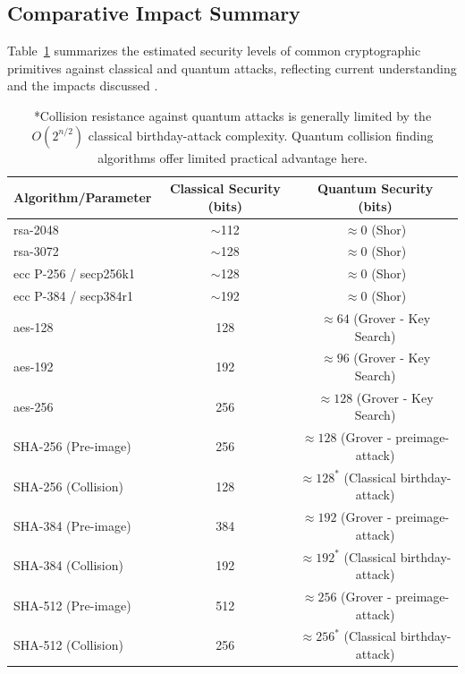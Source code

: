 \subsection{Comparative Impact Summary}\label{subsec:comparison_ch5_rev}
Table~\ref{tab:quantum_impact_ch5_rev_updated} summarizes the estimated security levels of common cryptographic primitives against classical and quantum attacks, reflecting current understanding and the impacts discussed \parencite{nist_pqc_status_report_ir8413}.

\begin{table}[h]
    \centering
    \caption{Estimated Security Levels (in bits) Against Classical and Quantum Attacks}
    \label{tab:quantum_impact_ch5_rev_updated}
    \begin{tabular}{@{}lcc@{}}
        \toprule
        \textbf{Algorithm/Parameter} & \textbf{Classical Security (bits)} & \textbf{Quantum Security (bits)} \\
        \midrule
        \gls{rsa}-2048 & $\sim$112 & $\approx 0$ (Shor) \\
        \gls{rsa}-3072 & $\sim$128 & $\approx 0$ (Shor) \\
        \gls{ecc} P-256 / secp256k1 & $\sim$128 & $\approx 0$ (Shor) \\
        \gls{ecc} P-384 / secp384r1 & $\sim$192 & $\approx 0$ (Shor) \\
        \midrule
        \gls{aes}-128 & 128 & $\approx 64$ (Grover - Key Search) \\
        \gls{aes}-192 & 192 & $\approx 96$ (Grover - Key Search) \\
        \gls{aes}-256 & 256 & $\approx 128$ (Grover - Key Search) \\
        \midrule
        SHA-256 (Pre-image) & 256 & $\approx 128$ (Grover - \gls{preimage-attack}) \\
        SHA-256 (Collision) & 128 & $\approx 128^*$ (Classical \gls{birthday-attack}) \\ %
        SHA-384 (Pre-image) & 384 & $\approx 192$ (Grover - \gls{preimage-attack}) \\
        SHA-384 (Collision) & 192 & $\approx 192^*$ (Classical \gls{birthday-attack}) \\
        SHA-512 (Pre-image) & 512 & $\approx 256$ (Grover - \gls{preimage-attack}) \\
        SHA-512 (Collision) & 256 & $\approx 256^*$ (Classical \gls{birthday-attack}) \\
        \bottomrule
    \end{tabular}
    \caption*{*Collision resistance against quantum attacks is generally limited by the $O(2^{n/2})$ classical \gls{birthday-attack} complexity. Quantum collision finding algorithms offer limited practical advantage here.} %
\end{table}

